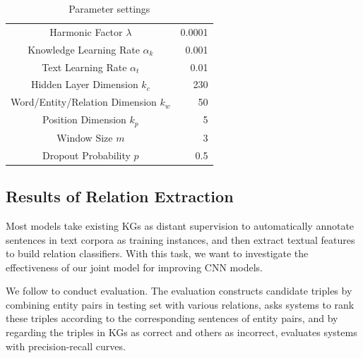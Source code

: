 \documentclass[11pt,a4paper]{article}
\begin{document}
\begin{table}[htb]
\centering
\small
\label{my-label}
\begin{tabular}{|cr|}
\hline
\multicolumn{1}{|c|}{Harmonic Factor $\lambda$}                & 0.0001 \\
\multicolumn{1}{|c|}{Knowledge Learning Rate $\alpha_k$}        & 0.001 \\
\multicolumn{1}{|c|}{Text Learning Rate $\alpha_t$}             & 0.01  \\
\multicolumn{1}{|c|}{Hidden Layer Dimension $k_c$}        & 230   \\
\multicolumn{1}{|c|}{Word/Entity/Relation Dimension $k_w$} & 50    \\
\multicolumn{1}{|c|}{Position Dimension $k_p$}            & 5     \\
\multicolumn{1}{|c|}{Window Size $m$}    & 3     \\
\multicolumn{1}{|c|}{Dropout Probability $p$}            & 0.5  \\
\hline
\end{tabular}
\caption{Parameter settings}
\label{parameters}
\end{table}


\subsection{Results of Relation Extraction}

Most models \cite{mintz2009distant,riedel2010modeling,hoffmann2011knowledge,surdeanu2012multi,zeng2014relation,zeng2015distant,lin2016neural} take existing KGs as distant supervision to automatically annotate sentences in text corpora as training instances, and then extract textual features to build relation classifiers. With this task, we want to investigate the effectiveness of our joint model for improving CNN models.


We follow \cite{weston2013connecting} to conduct evaluation. The evaluation constructs candidate triples by combining entity pairs in testing set with various relations, asks systems to rank these triples according to the corresponding sentences of entity pairs, and by regarding the triples in KGs as correct and others as incorrect, evaluates systems with precision-recall curves.
\end{document}
